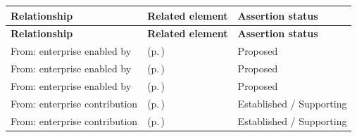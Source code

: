 \begingroup\small\setlength{\TableWidth}{\dimexpr\linewidth-6\tabcolsep-4\arrayrulewidth\relax}
\begin{longtable}{|>{\raggedright\arraybackslash}p{0.27\TableWidth}|>{\raggedright\arraybackslash}p{0.48\TableWidth}|>{\raggedright\arraybackslash}p{0.25\TableWidth}|}
\hline\rowcolor{TableHead}\textbf{Relationship} & \textbf{Related element} & \textbf{Assertion status}\\\hline\endfirsthead
\hline\rowcolor{TableHead}\textbf{Relationship} & \textbf{Related element} & \textbf{Assertion status}\\\hline\endhead
\hline\endfoot
From: enterprise enabled by & \nameref{cap:bec-clinical-collaboration} (p.\,\pageref{cap:bec-clinical-collaboration}) & Proposed\\\hline
From: enterprise enabled by & \nameref{cap:bec-general-collaboration} (p.\,\pageref{cap:bec-general-collaboration}) & Proposed\\\hline
From: enterprise enabled by & \nameref{cap:bec-presentation-services} (p.\,\pageref{cap:bec-presentation-services}) & Proposed\\\hline
From: enterprise contribution & \nameref{cap:bec-assurance-design} (p.\,\pageref{cap:bec-assurance-design}) & Established / Supporting\\\hline
From: enterprise contribution & \nameref{cap:bec-assurance-criteria-management} (p.\,\pageref{cap:bec-assurance-criteria-management}) & Established / Supporting\\\hline
\end{longtable}\endgroup

